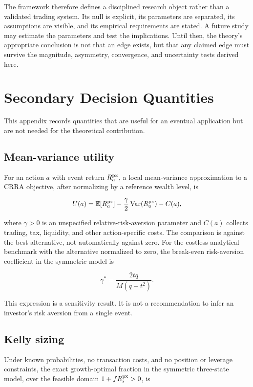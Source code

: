 The framework therefore defines a disciplined research object rather than a
validated trading system. Its null is explicit, its parameters are separated,
its assumptions are visible, and its empirical requirements are stated. A future
study may estimate the parameters and test the implications. Until then, the
theory's appropriate conclusion is not that an edge exists, but that any claimed
edge must survive the magnitude, asymmetry, convergence, and uncertainty tests
derived here.

\appendix

\section{Secondary Decision Quantities}
\label{app:decision}

This appendix records quantities that are useful for an eventual application but
are not needed for the theoretical contribution.

\subsection{Mean-variance utility}

For an action $a$ with event return $R^{\mathrm{px}}_a$, a local mean-variance approximation
to a CRRA objective, after normalizing by a reference wealth level, is

\[
U(a)=\mathbb{E}[R^{\mathrm{px}}_a]-\frac{\gamma}{2}\operatorname{Var}(R^{\mathrm{px}}_a)-C(a),
\]

where $\gamma>0$ is an unspecified relative-risk-aversion parameter and $C(a)$
collects trading, tax, liquidity, and other action-specific costs. The
comparison is against the best alternative, not automatically against zero. For
the costless analytical benchmark with the alternative normalized to zero, the
break-even risk-aversion coefficient in the symmetric model is

\[
\boxed{
\gamma^*=\frac{2tq}{M(q-t^2)}.
}
\]

This expression is a sensitivity result. It is not a recommendation to infer an
investor's risk aversion from a single event.

\subsection{Kelly sizing}

Under known probabilities, no transaction costs, and no position or leverage
constraints, the exact growth-optimal fraction in the symmetric three-state
model, over the feasible domain $1+fR^{\mathrm{px}}_i>0$, is

